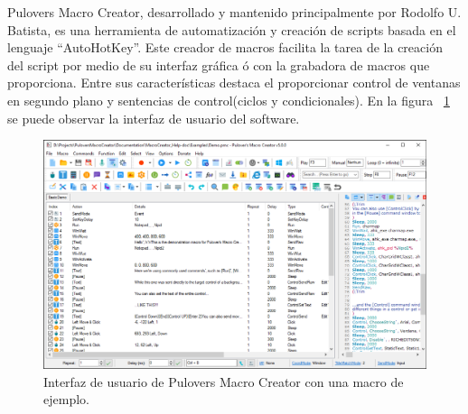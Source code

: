 Pulover\textsc{}s Macro Creator\cite{Batista}, desarrollado y mantenido
 principalmente por Rodolfo U. Batista, es una herramienta de automatizaci\'on
 y creaci\'on de scripts basada en el lenguaje ``AutoHotKey''. Este creador de
 macros facilita la tarea de la creaci\'on del script por medio de su interfaz
 gr\'afica \'o con la grabadora de macros que proporciona. Entre sus
 caracter\'isticas destaca el proporcionar control de ventanas en segundo plano
 y sentencias de control(ciclos y condicionales). En la figura
 ~\ref{fig:macros} se puede observar la interfaz de usuario del software.


\begin{figure}[h]
\centering
\includegraphics[width=0.7\columnwidth]{chap2/Imagenes/Macros.eps}
\caption{Interfaz de usuario de Pulovers Macro Creator con una macro de
 ejemplo.}
\label{fig:macros}
\end{figure}